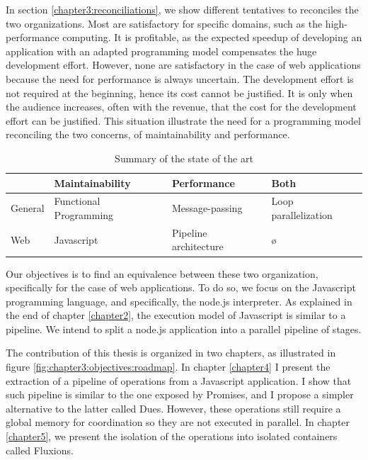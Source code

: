 In section \ref{chapter3:reconciliations}, we show different tentatives to reconciles the two organizations.
Most are satisfactory for specific domains, such as the high-performance computing.
It is profitable, as the expected speedup of developing an application with an adapted programming model compensates the huge development effort.
However, none are satisfactory in the case of web applications because the need for performance is always uncertain.
The development effort is not required at the beginning, hence its cost cannot be justified.
It is only when the audience increases, often with the revenue, that the cost for the development effort can be justified.
This situation illustrate the need for a programming model reconciling the two concerns, of maintainability and performance.


\begin{table}
\begin{tabular}{l|l|l|l}
             & Maintainability         & Performance           & Both\\\hline
General      & Functional Programming  & Message-passing       & Loop parallelization\\
Web          & Javascript              & Pipeline architecture & ø
\end{tabular}
\caption{Summary of the state of the art}
\label{tab:chapter3:objectives:summary}
\end{table}

Our objectives is to find an equivalence between these two organization, specifically for the case of web applications.
To do so, we focus on the Javascript programming language, and specifically, the node.js interpreter.
As explained in the end of chapter \ref{chapter2}, the execution model of Javascript is similar to a pipeline.
We intend to split a node.js application into a parallel pipeline of stages.

The contribution of this thesis is organized in two chapters, as illustrated in figure \ref{fig:chapter3:objectives:roadmap}.
In chapter \ref{chapter4} I present the extraction of a pipeline of operations from a Javascript application.
I show that such pipeline is similar to the one exposed by Promises, and I propose a simpler alternative to the latter called Dues.
However, these operations still require a global memory for coordination so they are not executed in parallel.
In chapter \ref{chapter5}, we present the isolation of the operations into isolated containers called Fluxions. 

